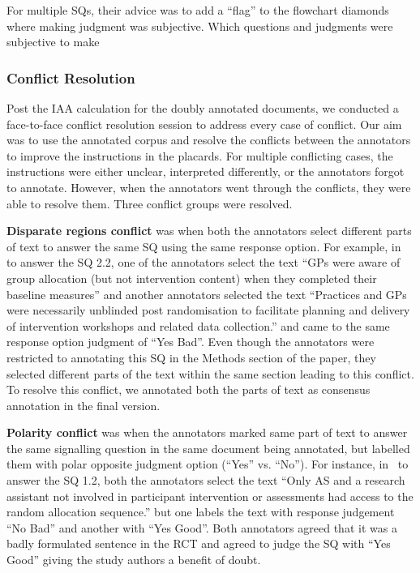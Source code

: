 \documentclass[sn-mathphys,Numbered]{sn-jnl}%
\theoremstyle{thmstyleone}%
\theoremstyle{thmstyletwo}%
\theoremstyle{thmstylethree}%
\begin{document}
For multiple SQs, their advice was to add a ``flag'' to the flowchart diamonds where making judgment was subjective. 
Which questions and judgments were subjective to make %
%
%
%
\subsubsection{Conflict Resolution}
\label{dis:conflict}
%
Post the IAA calculation for the doubly annotated documents, we conducted a face-to-face conflict resolution session to address every case of conflict.
Our aim was to use the annotated corpus and resolve the conflicts between the annotators to improve the instructions in the placards.
For multiple conflicting cases, the instructions were either unclear, interpreted differently, or the annotators forgot to annotate.
However, when the annotators went through the conflicts, they were able to resolve them.
Three conflict groups were resolved.

\textbf{Disparate regions conflict} was when both the annotators select different parts of text to answer the same SQ using the same response option.
For example, in~\cite{darlow2019fear} to answer the SQ 2.2, one of the annotators select the text ``GPs were aware of group allocation (but not intervention content) when they completed their baseline measures'' and another annotators selected the text ``Practices and GPs were necessarily unblinded post randomisation to facilitate planning and delivery of intervention workshops and related data collection.'' and came to the same response option judgment of ``Yes Bad''.
Even though the annotators were restricted to annotating this SQ in the Methods section of the paper, they selected different parts of the text within the same section leading to this conflict.
To resolve this conflict, we annotated both the parts of text as consensus annotation in the final version.

\textbf{Polarity conflict} was when the annotators marked same part of text to answer the same signalling question in the same document being annotated, but labelled them with polar opposite judgment option (``Yes'' vs. ``No'').
For instance, in~\cite{solomons2020intramuscular} to answer the SQ 1.2, both the annotators select the text ``Only AS and a research assistant not involved in participant intervention or assessments had access to the random allocation sequence.'' but one labels the text with response judgement ``No Bad'' and another with ``Yes Good''.
Both annotators agreed that it was a badly formulated sentence in the RCT and agreed to judge the SQ with ``Yes Good'' giving the study authors a benefit of doubt. 
\end{document}

